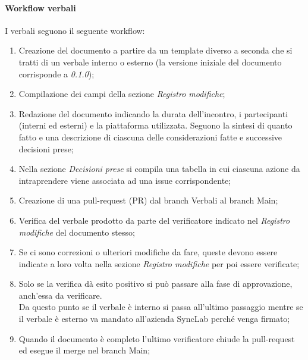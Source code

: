 \documentclass[10pt]{article}
\begin{document}
\begin{justify}
        \paragraph{Workflow verbali}
        I verbali seguono il seguente workflow:
        \begin{enumerate}
            \item Creazione del documento a partire da un template diverso a seconda che si tratti di un verbale interno o esterno (la versione iniziale del documento corrisponde a \textit{0.1.0});
            \item Compilazione dei campi della sezione \textit{Registro modifiche};
            \item Redazione del documento indicando la durata dell'incontro, i partecipanti (interni ed esterni) e la piattaforma utilizzata. Seguono la sintesi di quanto fatto e una descrizione di ciascuna delle considerazioni fatte e successive decisioni prese;
            \item Nella sezione \textit{Decisioni prese} si compila una 
            tabella in cui ciascuna azione da intraprendere viene associata ad una issue corrispondente;
            \item Creazione di una pull-request (PR) dal branch Verbali al branch Main;
            \item Verifica del verbale prodotto da parte del verificatore 
            indicato nel \textit{Registro modifiche} del documento stesso;
            \item Se ci sono correzioni o ulteriori modifiche da fare, queste devono essere indicate a loro volta nella sezione \textit{Registro modifiche} per poi essere verificate;
            \item Solo se la verifica dà esito positivo si può passare alla fase di approvazione, anch'essa da verificare. \\
            Da questo punto se il verbale è interno si passa all'ultimo passaggio mentre se il verbale è esterno va mandato all'azienda SyncLab perché venga firmato;
            \item Quando il documento è completo l'ultimo verificatore 
            chiude la pull-request ed esegue il merge nel branch Main;
        \end{enumerate}


\end{justify}
\end{document}

